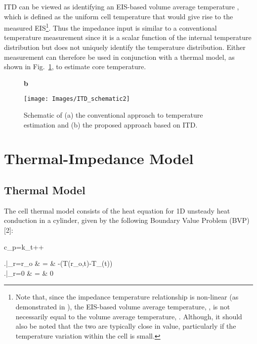 \documentclass[journal, english]{IEEEtran}
\begin{document}
ITD can be viewed as identifying an EIS-based volume average temperature
, which is defined as the uniform cell temperature
that would give rise to the measured EIS\footnote{Note that, since the impedance temperature relationship is non-linear (as demonstrated in \cite{Troxler2013}), the EIS-based volume average temperature,
, is not necessarily equal to the volume average
temperature, . Although, it should also be noted that the two are typically close
in value, particularly if the temperature variation within the cell
is small. }. Thus the impedance input is similar to a conventional
temperature measurement since it is a scalar function of the internal
temperature distribution but does not uniquely identify the temperature
distribution. Either measurement can therefore be used in conjunction
with a thermal model, as shown in Fig.\ \ref{fig:Schematic}, to estimate core temperature.
\begin{figure}[h]
	{ \hspace{4cm} {\large\textbf{b}} \par\vspace{0.0cm}}
\begin{centering}
\texttt{[image: Images/ITD\_schematic2]}
\par\end{centering}
\caption{Schematic of (a) the conventional approach to temperature estimation and (b)
the proposed approach based on ITD.\label{fig:Schematic}}
\end{figure}

\section{Thermal-Impedance Model}

\subsection{Thermal Model}
The cell thermal model consists of the heat equation for 1D unsteady heat conduction in a cylinder, given by the following Boundary Value Problem (BVP) {[}2{]}: \addtocounter{equation}{0}

\rho c_{p}=k_{t}++\label{eq:heat_time}

\left.\right|_{r=r_{o}} & = & -(T(r_{o},t)-T_{\infty}(t)) \label{eq:BC1}\\
\left.\right|_{r=0} & = & 0\label{eq:BC2}
\end{document}
